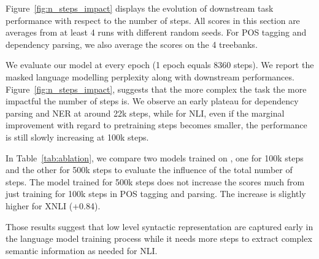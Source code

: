 Figure~\ref{fig:n_steps_impact} displays the evolution of downstream task performance with respect to the number of steps. %
All scores in this section are averages from at least 4 runs with different random seeds. For POS tagging and dependency parsing, we also average the scores on the 4 treebanks.

We evaluate our model at every epoch (1 epoch equals 8360 steps). We report the masked language modelling perplexity along with downstream performances.
Figure~\ref{fig:n_steps_impact}, suggests that the more complex the task the more impactful the number of steps is. We observe an early plateau for dependency parsing and NER at around 22k steps, while for NLI, even if the marginal improvement with regard to pretraining steps becomes smaller, the performance is still slowly increasing at 100k steps.

In Table~\ref{tab:ablation}, we compare two models trained on \ccnet, one for 100k steps and the other for 500k steps to evaluate the influence of the total number of steps.
The model trained for 500k steps does not increase the scores much from just training for 100k steps in POS tagging and parsing.
The increase is slightly higher for XNLI (+0.84).


Those results suggest that low level syntactic representation are captured early in the language model training process while it needs more steps to extract complex semantic information as needed for NLI.